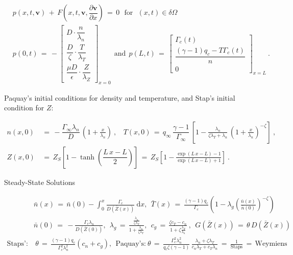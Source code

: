 \documentclass[a4paper,8pt]{article}
\begin{document}
\begin{align}
    &p\left(x, t, \mathbf{v}\right) \,+\, F\left(x, t, \mathbf{v}, \dfrac{\partial\mathbf{v}}{\partial x}\right) \,=\, 0 ~~~ \text{for} ~~~ (x, t) \in \delta\Omega \\
&p(0, t) \,=\, -\begin{bmatrix}
                D \cdot \dfrac{n}{\lambda_n}\\[2ex]
                \dfrac{D}{\zeta} \cdot \dfrac{T}{\lambda_T} \\[2ex]
                \dfrac{\mu D}{\epsilon} \cdot \dfrac{Z}{\lambda_Z}
                \end{bmatrix}_{x = 0}
~~ \text{and} ~~
p(L, t) \,=\, \begin{bmatrix}
                \Gamma_c(t) \\[1ex]
                \dfrac{(\gamma - 1) q_c - T\Gamma_c(t)}{n} \\[2ex]
                0
                \end{bmatrix}_{x=L}~.
\end{align}

\normalsize

Paquay's initial conditions for density and temperature, and Stap's
initial condition for \(Z\): \small

\begin{align}
    n(x,0) \,&=\, -\dfrac{\Gamma_\infty \lambda_n}{D} \, \left(1 + \frac{x}{\lambda_n}\right)~, ~~~~ T(x,0) \,=\, q_\infty \, \dfrac{\gamma - 1}{\Gamma_\infty} \, \left[1 - \frac{\lambda_n}{\zeta \lambda_T + \lambda_n} \, \left(1 + \frac{x}{\lambda_n}\right)^{-\zeta}\right]~, \\
    Z(x,0) \,&=\, Z_S\left[1 - \tanh\left(\dfrac{L\,x - L}{2}\right)\right] \,=\, Z_S\left[1 - \frac{\exp(L\,x - L) - 1}{\exp(L\,x - L) + 1}\right]~.
\end{align}

\normalsize

Steady-State Solutions \small

\begin{align}
    &\bar{n}(x) \,=\, \bar{n}(0) - \int_0^x \frac{\Gamma_c}{D(\bar{Z}(x))}~\text{d}x, ~~ \bar{T}(x) \,=\, \frac{(\gamma - 1) q_c}{\Gamma_c} \left(1 - \lambda_g\left(\frac{\bar{n}(x)}{\bar{n}(0)}\right)^{-\zeta}\right) \\
    &\bar{n}(0) \,=\, -\frac{\Gamma_c \lambda_n}{D(\bar{Z}(0))}, ~~ \lambda_g \,=\, \frac{\frac{\lambda_n}{\zeta \lambda_T}}{1 + \frac{\lambda_n}{\zeta \lambda_T}}, ~~ c_g \,=\, \frac{\zeta c_T - c_n}{1 + \zeta \frac{\lambda_T}{\lambda_n}}~, ~~ G(\bar{Z}(x)) \,=\, \theta\,D(\bar{Z}(x)) \\
    \text{Staps':}& ~ \theta \,=\, \frac{(\gamma - 1) q_c}{\Gamma_c^2 \lambda_n^2} (c_n + c_g), ~~ \text{Paquay's:} ~ \theta \,=\, \frac{\Gamma_c^2 \lambda_n^2}{q_c \zeta (\gamma - 1)} \, \frac{\lambda_n + \zeta\lambda_T}{c_n\lambda_T + c_T\lambda_n} \,=\, \frac{1}{\text{Staps}} \,=\, \text{Weymiens}
\end{align}
\end{document}
